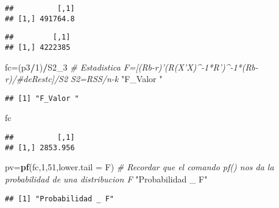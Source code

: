 \documentclass[
]{article}
\newenvironment{Shaded}{\begin{snugshade}}{\end{snugshade}}
\newcommand{\CommentTok}[1]{\textcolor[rgb]{0.56,0.35,0.01}{\textit{#1}}}
\newcommand{\DataTypeTok}[1]{\textcolor[rgb]{0.13,0.29,0.53}{#1}}
\newcommand{\DecValTok}[1]{\textcolor[rgb]{0.00,0.00,0.81}{#1}}
\newcommand{\KeywordTok}[1]{\textcolor[rgb]{0.13,0.29,0.53}{\textbf{#1}}}
\newcommand{\NormalTok}[1]{#1}
\newcommand{\OperatorTok}[1]{\textcolor[rgb]{0.81,0.36,0.00}{\textbf{#1}}}
\newcommand{\StringTok}[1]{\textcolor[rgb]{0.31,0.60,0.02}{#1}}
\begin{document}
\begin{verbatim}
##          [,1]
## [1,] 491764.8
\end{verbatim}

\begin{Shaded}
\end{Shaded}

\begin{verbatim}
##         [,1]
## [1,] 4222385
\end{verbatim}

\begin{Shaded}
\begin{Highlighting}[]
\NormalTok{fc=(p3}\OperatorTok{/}\DecValTok{1}\NormalTok{)}\OperatorTok{/}\NormalTok{S2_}\DecValTok{3}    \CommentTok{# Estadistica F=[(Rb-r)'(R(X'X)^-1*R')^-1*(Rb-r)/#deRestc]/S2    S2=RSS/n-k}
\StringTok{"F_Valor "}
\end{Highlighting}
\end{Shaded}

\begin{verbatim}
## [1] "F_Valor "
\end{verbatim}

\begin{Shaded}
\begin{Highlighting}[]
\NormalTok{fc}
\end{Highlighting}
\end{Shaded}

\begin{verbatim}
##          [,1]
## [1,] 2853.956
\end{verbatim}

\begin{Shaded}
\begin{Highlighting}[]
\NormalTok{pv=}\KeywordTok{pf}\NormalTok{(fc,}\DecValTok{1}\NormalTok{,}\DecValTok{51}\NormalTok{,}\DataTypeTok{lower.tail =}\NormalTok{ F)    }\CommentTok{# Recordar que el comando pf() nos da la probabilidad de una distribucion F }
\StringTok{"Probabilidad _ F"}
\end{Highlighting}
\end{Shaded}

\begin{verbatim}
## [1] "Probabilidad _ F"
\end{verbatim}
\end{document}
